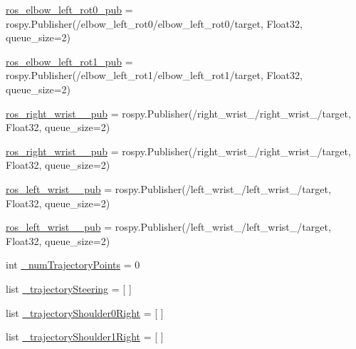 \begin{DoxyCompactItemize}
\item 
\mbox{\hyperlink{namespacesteering__test_aa66741274116f72f65fa6fafa1d80e27}{ros\+\_\+elbow\+\_\+left\+\_\+rot0\+\_\+pub}} = rospy.\+Publisher(\textquotesingle{}/elbow\+\_\+left\+\_\+rot0/elbow\+\_\+left\+\_\+rot0/target\textquotesingle{}, Float32, queue\+\_\+size=2)
\item 
\mbox{\hyperlink{namespacesteering__test_a5791cb7f60a031447e40dcdfdca9b56f}{ros\+\_\+elbow\+\_\+left\+\_\+rot1\+\_\+pub}} = rospy.\+Publisher(\textquotesingle{}/elbow\+\_\+left\+\_\+rot1/elbow\+\_\+left\+\_\+rot1/target\textquotesingle{}, Float32, queue\+\_\+size=2)
\item 
\mbox{\hyperlink{namespacesteering__test_aa52230dd83b1d4238ff1ed66e9c8dcb0}{ros\+\_\+right\+\_\+wrist\+\_\+\_\+pub}} = rospy.\+Publisher(\textquotesingle{}/right\+\_\+wrist\+\_/right\+\_\+wrist\+\_/target\textquotesingle{}, Float32, queue\+\_\+size=2)
\item 
\mbox{\hyperlink{namespacesteering__test_a36ffa072e07b0e9d175e7617d457043f}{ros\+\_\+right\+\_\+wrist\+\_\+\_\+pub}} = rospy.\+Publisher(\textquotesingle{}/right\+\_\+wrist\+\_/right\+\_\+wrist\+\_/target\textquotesingle{}, Float32, queue\+\_\+size=2)
\item 
\mbox{\hyperlink{namespacesteering__test_a9e0e15152563b59b6674fef68cdfe5f8}{ros\+\_\+left\+\_\+wrist\+\_\+\_\+pub}} = rospy.\+Publisher(\textquotesingle{}/left\+\_\+wrist\+\_/left\+\_\+wrist\+\_/target\textquotesingle{}, Float32, queue\+\_\+size=2)
\item 
\mbox{\hyperlink{namespacesteering__test_a35b7e471c7ef86af97fb59c5ac98e45e}{ros\+\_\+left\+\_\+wrist\+\_\+\_\+pub}} = rospy.\+Publisher(\textquotesingle{}/left\+\_\+wrist\+\_/left\+\_\+wrist\+\_/target\textquotesingle{}, Float32, queue\+\_\+size=2)
\item 
int \mbox{\hyperlink{namespacesteering__test_a49203e5b5f23258ce3d6d63e39994fbf}{\+\_\+num\+Trajectory\+Points}} = 0
\item 
list \mbox{\hyperlink{namespacesteering__test_aa5d9707d93eda9c9148796e7e86a304c}{\+\_\+trajectory\+Steering}} = \mbox{[} \mbox{]}
\item 
list \mbox{\hyperlink{namespacesteering__test_a6dfa1501d3b7df501af8050ff410db04}{\+\_\+trajectory\+Shoulder0\+Right}} = \mbox{[} \mbox{]}
\item 
list \mbox{\hyperlink{namespacesteering__test_a81a1c9bd7783f87723b4b369f5d8fc5b}{\+\_\+trajectory\+Shoulder1\+Right}} = \mbox{[} \mbox{]}
\item 

\end{DoxyCompactItemize}

